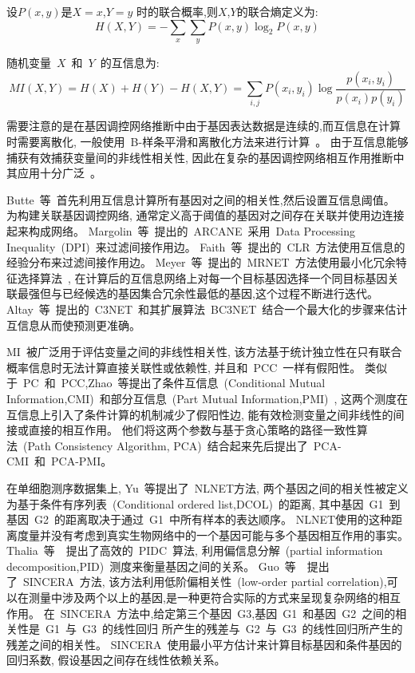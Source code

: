 \begin{enumerate}
设$P(x,y)$是$X=x$,$Y=y$ 时的联合概率,则$X$,$Y$的联合熵定义为:
\begin{equation}
H(X,Y) =  - \sum\limits_x {\sum\limits_y {P(x,y)\log _2 P(x,y)} } 
\end{equation}

随机变量~$X$~和~$Y$~的互信息为:
\begin{equation}
MI(X,Y) = H(X) + H(Y) - H(X,Y) = \sum\limits_{i,j} {P(x_i ,y_i )\log \frac{{p(x_i,y_i )}}{{p(x_i )p(y_i )}}} 
\end{equation}

需要注意的是在基因调控网络推断中由于基因表达数据是连续的,而互信息在计算时需要离散化,
一般使用~B-样条平滑和离散化方法来进行计算~\cite{daub2004estimating}。
由于互信息能够捕获有效捕获变量间的非线性相关性,
因此在复杂的基因调控网络相互作用推断中其应用十分广泛~\cite{brunel2010miss,zhang2011inferring}。

Butte~等~\cite{basso2005reverse}首先利用互信息计算所有基因对之间的相关性,然后设置互信息阈值。
为构建关联基因调控网络, 通常定义高于阈值的基因对之间存在关联并使用边连接起来构成网络。
Margolin~等~\cite{margolin2006aracne}提出的~ARCANE~采用~Data Processing Inequality~(DPI)~来过滤间接作用边。
Faith~等~\cite{faith2007large}提出的~CLR~方法使用互信息的经验分布来过滤间接作用边。
Meyer~等~\cite{meyer2007information}提出的~MRNET~方法使用最小化冗余特征选择算法~\cite{peng2005feature},
在计算后的互信息网络上对每一个目标基因选择一个同目标基因关联最强但与已经候选的基因集合冗余性最低的基因,这个过程不断进行迭代。
Altay~等~\cite{altay2010inferring}提出的~C3NET~和其扩展算法~BC3NET~\cite{de2012bagging}结合一个最大化的步骤来估计互信息从而使预测更准确。

MI~被广泛用于评估变量之间的非线性相关性,
该方法基于统计独立性在只有联合概率信息时无法计算直接关联性或依赖性,
并且和~PCC~一样有假阳性\cite{frenzel2007partial,schreiber2000measuring}。
类似于~PC~和~PCC,Zhao~等提出了条件互信息~(Conditional Mutual Information,CMI)~\cite{zhang2011inferring}和部分互信息~(Part Mutual Information,PMI)~\cite{zhao2016part},
这两个测度在互信息上引入了条件计算的机制减少了假阳性边,
能有效检测变量之间非线性的间接或直接的相互作用。
他们将这两个参数与基于贪心策略的路径一致性算法~(Path Consistency Algorithm, PCA)~结合起来先后提出了~PCA-CMI\cite{zhang2011inferring}~和~PCA-PMI\cite{zhao2016part}。
\end{enumerate}

在单细胞测序数据集上,
Yu~等提出了~NLNET方法\cite{yu2013hierarchical}, 
两个基因之间的相关性被定义为基于条件有序列表~(Conditional ordered list,DCOL)~的距离,
其中基因~G1~到基因~G2~的距离取决于通过~G1~中所有样本的表达顺序。
NLNET使用的这种距离度量并没有考虑到真实生物网络中的一个基因可能与多个基因相互作用的事实。
Thalia~等~\cite{chan2017gene}~提出了高效的~PIDC~算法,
利用偏信息分解~(partial information decomposition,PID)~测度来衡量基因之间的关系。
Guo~等~\cite{guo2015sincera}~提出了~SINCERA~方法, 该方法利用低阶偏相关性~(low-order partial correlation),可以在测量中涉及两个以上的基因,是一种更符合实际的方式来呈现复杂网络的相互作用。
在~SINCERA~方法中,给定第三个基因~G3,基因~G1~和基因~G2~之间的相关性是~G1~与~G3~的线性回归
所产生的残差与~G2~与~G3~的线性回归所产生的残差之间的相关性。
SINCERA~使用最小平方估计来计算目标基因和条件基因的回归系数, 假设基因之间存在线性依赖关系。

